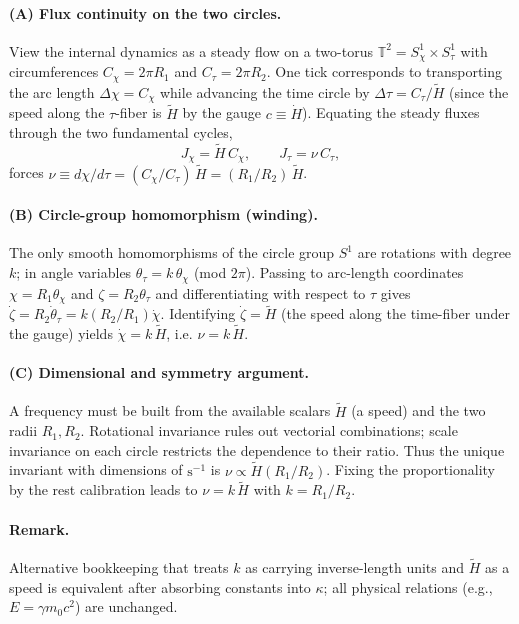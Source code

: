\documentclass[11pt,a4paper]{article}
\newcommand{\tH}{\tilde{H}}
\newcommand{\ga}{\gamma}
\begin{document}
\paragraph{(A) Flux continuity on the two circles.} View the internal dynamics as a steady flow on a two-torus $\mathbb T^2=S^1_{\chi}\times S^1_{\tau}$ with circumferences $C_{\chi}=2\pi R_1$ and $C_{\tau}=2\pi R_2$. One tick corresponds to transporting the arc length $\Delta\chi=C_{\chi}$ while advancing the time circle by $\Delta\tau=C_{\tau}/\tH$ (since the speed along the $\tau$-fiber is $\tH$ by the gauge $c\equiv \dot H$). Equating the steady fluxes through the two fundamental cycles,
\[
J_{\chi}=\tH\,C_{\chi},\qquad J_{\tau}=\nu\,C_{\tau},
\]
forces $\nu \equiv d\chi/d\tau = (C_{\chi}/C_{\tau})\,\tH = (R_1/R_2)\,\tH$.

\paragraph{(B) Circle-group homomorphism (winding).} The only smooth homomorphisms of the circle group $S^1$ are rotations with degree $k$; in angle variables $\theta_{\tau}=k\,\theta_{\chi}$ (mod $2\pi$). Passing to arc-length coordinates $\chi=R_1\theta_{\chi}$ and $\zeta=R_2\theta_{\tau}$ and differentiating with respect to $\tau$ gives $\dot\zeta=R_2\dot\theta_{\tau}=k(R_2/R_1)\dot\chi$. Identifying $\dot\zeta=\tH$ (the speed along the time-fiber under the gauge) yields $\dot\chi= k\,\tH$, i.e. $\nu=k\,\tH$.

\paragraph{(C) Dimensional and symmetry argument.} A frequency must be built from the available scalars $\tH$ (a speed) and the two radii $R_1,R_2$. Rotational invariance rules out vectorial combinations; scale invariance on each circle restricts the dependence to their ratio. Thus the unique invariant with dimensions of $\mathrm{s^{-1}}$ is $\nu \propto \tH (R_1/R_2)$. Fixing the proportionality by the rest calibration leads to $\nu=k\,\tH$ with $k=R_1/R_2$.

\paragraph{Remark.} Alternative bookkeeping that treats $k$ as carrying inverse-length units and $\tH$ as a speed is equivalent after absorbing constants into $\kappa$; all physical relations (e.g., $E=\ga m_0 c^2$) are unchanged.
\end{document}
